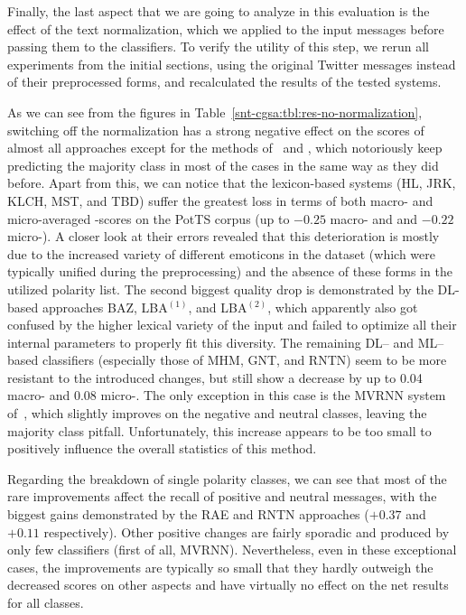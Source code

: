 Finally, the last aspect that we are going to analyze in this
evaluation is the effect of the text normalization, which we applied
to the input messages before passing them to the classifiers.  To
verify the utility of this step, we rerun all experiments from the
initial sections, using the original Twitter messages instead of their
preprocessed forms, and recalculated the results of the tested
systems.

As we can see from the figures in
Table~\ref{snt-cgsa:tbl:res-no-normalization}, switching off the
normalization has a strong negative effect on the scores of almost all
approaches except for the methods of~\citet{Yessenalina:10} and
\citet{Socher:12,Socher:13}, which notoriously keep predicting the
majority class in most of the cases in the same way as they did
before.  Apart from this, we can notice that the lexicon-based systems
(HL, JRK, KLCH, MST, and TBD) suffer the greatest loss in terms of
both macro- and micro-averaged \F{}-scores on the PotTS corpus (up to
$-0.25$ macro- and and $-0.22$ micro-\F{}).  A closer look at their
errors revealed that this deterioration is mostly due to the increased
variety of different emoticons in the dataset (which were typically
unified during the preprocessing) and the absence of these forms in
the utilized polarity list.  The second biggest quality drop is
demonstrated by the DL-based approaches BAZ, LBA$^{(1)}$, and
LBA$^{(2)}$, which apparently also got confused by the higher lexical
variety of the input and failed to optimize all their internal
parameters to properly fit this diversity.  The remaining DL-- and
ML--based classifiers (especially those of MHM, GNT, and RNTN) seem to
be more resistant to the introduced changes, but still show a decrease
by up to 0.04 macro- and 0.08 micro-\F{}.  The only exception in this
case is the MVRNN system of~\citet{Socher:12}, which slightly improves
on the negative and neutral classes, leaving the majority class
pitfall.  Unfortunately, this increase appears to be too small to
positively influence the overall statistics of this method.

Regarding the breakdown of single polarity classes, we can see that
most of the rare improvements affect the recall of positive and
neutral messages, with the biggest gains demonstrated by the RAE and
RNTN approaches ($+0.37$ and $+0.11$ respectively).  Other positive
changes are fairly sporadic and produced by only few classifiers
(first of all, MVRNN).  Nevertheless, even in these exceptional cases,
the improvements are typically so small that they hardly outweigh the
decreased scores on other aspects and have virtually no effect on the
net results for all classes.

